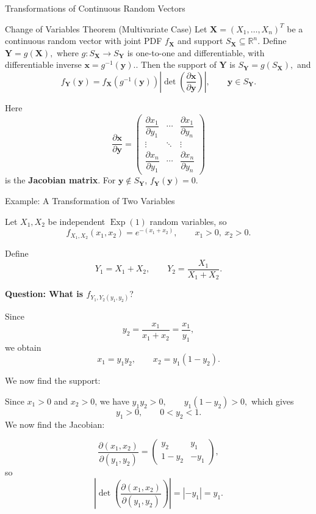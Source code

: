 \begin{frame}{Transformations of Continuous Random Vectors}

\small

\begin{keybox}{Change of Variables Theorem (Multivariate Case)}
Let $\mathbf X=(X_1,\ldots,X_n)^T$ be a continuous random vector with joint PDF $f_{\mathbf X}$ and support
$S_{\mathbf X}\subseteq\mathbb R^n$. Define $\mathbf Y=g(\mathbf X),
$ where $g:S_{\mathbf X}\to S_{\mathbf Y}$ is one-to-one and differentiable,
with differentiable inverse $\mathbf x=g^{-1}(\mathbf y).
$. Then the support of $\mathbf Y$ is $S_{\mathbf Y}=g(S_{\mathbf X}),
$ and
\[
{
f_{\mathbf Y}(\mathbf y)
=
f_{\mathbf X}\!\left(g^{-1}(\mathbf y)\right)
\left|
\det\!\left(
\frac{\partial \mathbf x}{\partial \mathbf y}
\right)
\right|,
\qquad \mathbf y\in S_{\mathbf Y}.
}
\]

Here
\[
\frac{\partial \mathbf x}{\partial \mathbf y}
=
\begin{pmatrix}
\dfrac{\partial x_1}{\partial y_1} & \cdots &
\dfrac{\partial x_1}{\partial y_n}\\
\vdots & \ddots & \vdots\\
\dfrac{\partial x_n}{\partial y_1} & \cdots &
\dfrac{\partial x_n}{\partial y_n}
\end{pmatrix}
\]
is the \textbf{Jacobian matrix}. For $\mathbf y\notin S_{\mathbf Y}$,
$f_{\mathbf Y}(\mathbf y)=0$.
\end{keybox}

\end{frame}


\begin{frame}{Example: A Transformation of Two Variables}

\small

Let $X_1,X_2$ be independent $\operatorname{Exp}(1)$ random variables, so
\[
f_{X_1,X_2}(x_1,x_2)
=
e^{-(x_1+x_2)},
\qquad x_1>0,\ x_2>0.
\]

Define
\[
Y_1=X_1+X_2,
\qquad
Y_2=\frac{X_1}{X_1+X_2}.
\]

\textbf{Question: What is $f_{Y_1,Y_2(y_1,y_2)}$}?

Since
\[
y_2=\frac{x_1}{x_1+x_2}=\frac{x_1}{y_1},
\]
we obtain
\[
{
x_1=y_1y_2,
\qquad
x_2=y_1(1-y_2).
}
\]

We now find the support:
 
Since $x_1>0$ and $x_2>0$, we have $y_1y_2>0,
\qquad
y_1(1-y_2)>0,$ which gives
\[
{
y_1>0,
\qquad
0<y_2<1.
}
\]
We now find the Jacobian: 

\[
\frac{\partial(x_1,x_2)}{\partial(y_1,y_2)}
=
\begin{pmatrix}
y_2 & y_1\\
1-y_2 & -y_1
\end{pmatrix},
\]
so
\[
\left|
\det\left(
\frac{\partial(x_1,x_2)}{\partial(y_1,y_2)}
\right)
\right|
=
|-y_1|
=
y_1.
\]

\end{frame}


